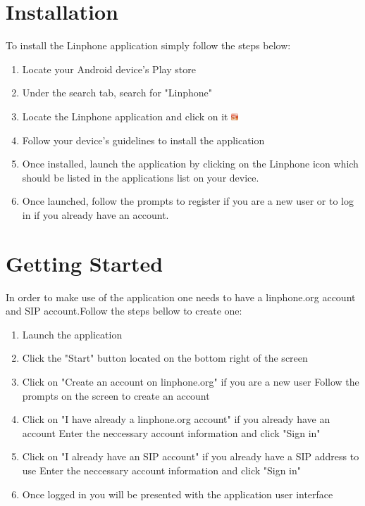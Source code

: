 \documentclass[11pt]{article}
\begin{document}
\section{Installation}
To install the Linphone application simply follow the steps below:
\begin{enumerate}
\item Locate your Android device's Play store
\item Under the search tab, search for "Linphone"
\item Locate the Linphone application and click on it
 \includegraphics[width=10px]{./images/icon.jpg}
\item Follow your device's guidelines to install the application
\item Once installed, launch the application by clicking on the Linphone icon which should be listed in the applications list on your device.
\item Once launched, follow the prompts to register if you are a new user or to log in if you already have an account.
\end{enumerate}

\section{Getting Started}
In order to make use of the application one needs to have a linphone.org account and SIP account.Follow the steps bellow to create one:
\begin{enumerate}
\item Launch the application
\item Click the "Start" button located on the bottom right of the screen
\item Click on "Create an account on linphone.org" if you are a new user 
\subitem Follow the prompts on the screen to create an account
\item Click on "I have already a linphone.org account" if you already have an account
\subitem Enter the neccessary account information and click "Sign in"
\item Click on "I already have an SIP account" if you already have a SIP address to use
\subitem Enter the neccessary account information and click "Sign in"
\item Once logged in you will be presented with the application user interface
\end{enumerate}
\end{document}
